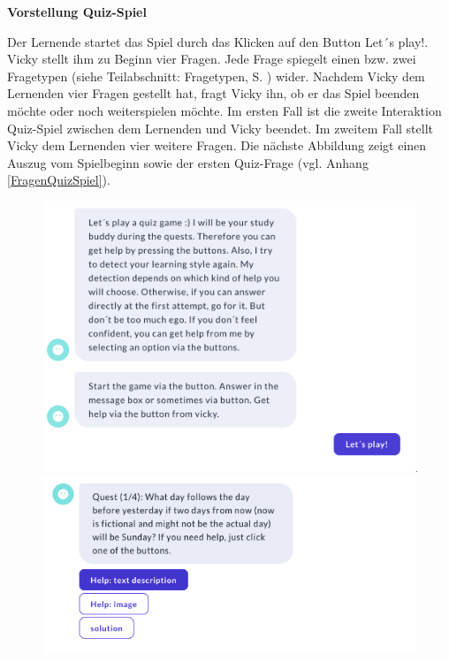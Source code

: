 \textbf{Vorstellung Quiz-Spiel}

Der Lernende startet das Spiel durch das Klicken auf den Button \glqq Let´s play!\grqq{}.
Vicky stellt ihm zu Beginn vier Fragen. Jede Frage spiegelt einen bzw. zwei Fragetypen (siehe Teilabschnitt: Fragetypen, S. \pageref{Fragetypen})
wider. Nachdem Vicky dem Lernenden vier Fragen gestellt hat, fragt Vicky ihn, ob er das Spiel beenden möchte
oder noch weiterspielen möchte. Im ersten Fall ist die zweite Interaktion Quiz-Spiel zwischen dem Lernenden und 
Vicky beendet. Im zweitem Fall stellt Vicky dem Lernenden vier weitere Fragen. 
Die nächste Abbildung zeigt einen Auszug vom Spielbeginn sowie der ersten Quiz-Frage (vgl. Anhang \ref{FragenQuizSpiel}).
\begin{figure}[H]
  \centering
  \includegraphics[width=0.65\linewidth]{images/VickyQuiz/gamestart.png}
  \includegraphics[width=0.65\linewidth]{images/game/q1.png}

\end{figure}
